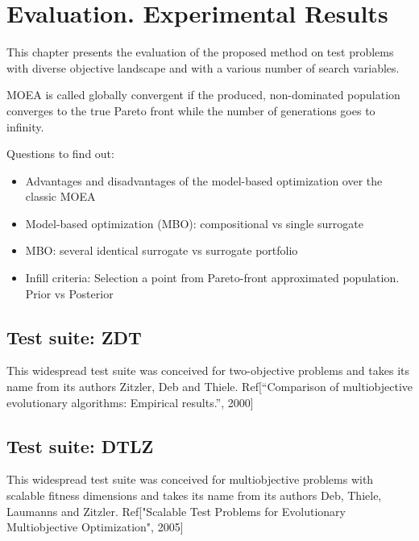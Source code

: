 \chapter{Evaluation. Experimental Results} 

This chapter presents the evaluation of the proposed method on test problems with diverse objective landscape and with a various number of search variables.

MOEA is called globally convergent if the produced, non-dominated population converges to the true Pareto front while the number of generations goes to infinity.

Questions to find out:
\begin{itemize}
    \item Advantages and disadvantages of the model-based optimization over the classic MOEA
    \item Model-based optimization (MBO): compositional vs single surrogate 
    \item MBO: several identical surrogate vs surrogate portfolio
    \item Infill criteria: Selection a point from Pareto-front approximated population. Prior vs Posterior
\end{itemize}

\cite{kouwe2018benchmarking}

\section{Test suite: ZDT}
This widespread test suite was conceived for two-objective problems and takes its name from its authors Zitzler, Deb and Thiele.
Ref[“Comparison of multiobjective evolutionary algorithms: Empirical results.”, 2000]

\section{Test suite: DTLZ}
This widespread test suite was conceived for multiobjective problems with scalable fitness dimensions and takes its name from its authors Deb, Thiele, Laumanns and Zitzler.
Ref["Scalable Test Problems for Evolutionary Multiobjective Optimization", 2005]


